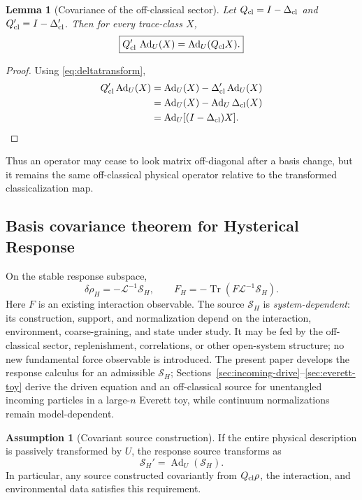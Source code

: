\documentclass[11pt]{article}
\newtheorem{lemma}[theorem]{Lemma}
\theoremstyle{definition}
\newtheorem{assumption}[theorem]{Assumption}
\theoremstyle{remark}
\newcommand{\Tr}{\operatorname{Tr}}
\newcommand{\Ad}{\operatorname{Ad}}
\begin{document}
\begin{lemma}[Covariance of the off-classical sector]
Let $Q_{\rm cl}=I-\Delta_{\rm cl}$ and $Q_{\rm cl}'=I-\Delta_{\rm cl}'$. Then for every trace-class $X$,
\begin{equation}
 \boxed{Q_{\rm cl}'\,\Ad_U(X)=\Ad_U(Q_{\rm cl}X).}
 \label{eq:Qcov}
\end{equation}
\end{lemma}

\begin{proof}
Using \eqref{eq:deltatransform},
\begin{align}
 Q_{\rm cl}'\Ad_U(X)
 &=\Ad_U(X)-\Delta_{\rm cl}'\Ad_U(X)\\
 &=\Ad_U(X)-\Ad_U\Delta_{\rm cl}(X)\\
 &=\Ad_U[(I-\Delta_{\rm cl})X].
\end{align}
\end{proof}

Thus an operator may cease to look matrix off-diagonal after a basis change, but it remains the same off-classical physical operator relative to the transformed classicalization map.

\subsection{Basis covariance theorem for Hysterical Response}
On the stable response subspace,
\begin{equation}
 \delta\rho_H=-\mathcal L^{-1}\mathcal S_H,
 \qquad
 F_H=-\Tr(F\mathcal L^{-1}\mathcal S_H).
 \label{eq:paper1response}
\end{equation}
Here $F$ is an existing interaction observable.
The source $\mathcal S_H$ is \emph{system-dependent}: its construction, support, and normalization depend on the interaction, environment, coarse-graining, and state under study.
It may be fed by the off-classical sector, replenishment, correlations, or other open-system structure; no new fundamental force observable is introduced.
The present paper develops the response calculus for an admissible $\mathcal S_H$; Sections~\ref{sec:incoming-drive}--\ref{sec:everett-toy} derive the driven equation and an off-classical source for unentangled incoming particles in a large-$n$ Everett toy, while continuum normalizations remain model-dependent.

\begin{assumption}[Covariant source construction]
If the entire physical description is passively transformed by $U$, the response source transforms as
\begin{equation}
 \mathcal S_H'=\Ad_U(\mathcal S_H).
 \label{eq:sourcecov}
\end{equation}
In particular, any source constructed covariantly from $Q_{\rm cl}\rho$, the interaction, and environmental data satisfies this requirement.
\end{assumption}
\end{document}

